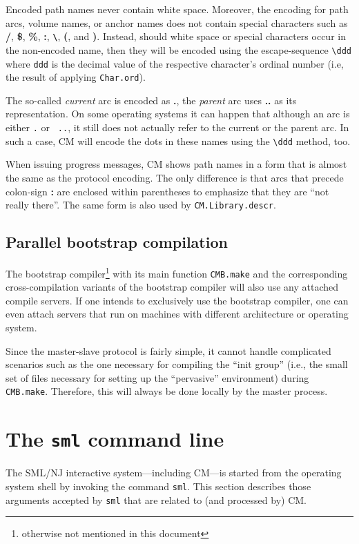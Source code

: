 \documentclass[titlepage,letterpaper]{article}
\begin{document}
Encoded path names never contain white space.  Moreover, the encoding
for path arcs, volume names, or anchor names does not contain special
characters such as {\bf /}, {\bf \$}, {\bf \%}, {\bf :}, {\bf
\verb|\|}, {\bf (}, and {\bf )}.  Instead, should white space or
special characters occur in the non-encoded name, then they will be
encoded using the escape-sequence \verb|\ddd| where {\tt ddd} is the
decimal value of the respective character's ordinal number (i.e, the
result of applying {\tt Char.ord}).

The so-called {\em current} arc is encoded as {\bf .}, the {\em
parent} arc uses {\bf ..} as its representation.  On some operating
systems it can happen that although an arc is either {\tt .} or {\tt
..}, it still does not actually refer to the current or the parent
arc.  In such a case, CM will encode the dots in these names using the
\verb|\ddd| method, too.

When issuing progress messages, CM shows path names in a form that is
almost the same as the protocol encoding.  The only difference is that
arcs that precede colon-sign {\bf :} are enclosed within parentheses
to emphasize that they are ``not really there''.  The same form is
also used by {\tt CM.Library.descr}.

\subsection{Parallel bootstrap compilation}

The bootstrap compiler\footnote{otherwise not mentioned in this
document} with its main function {\tt CMB.make} and the corresponding
cross-compilation variants of the bootstrap compiler will also use any
attached compile servers.  If one intends to exclusively use the
bootstrap compiler, one can even attach servers that run on machines
with different architecture or operating system.

Since the master-slave protocol is fairly simple, it cannot handle
complicated scenarios such as the one necessary for compiling the
``init group'' (i.e., the small set of files necessary for setting up
the ``pervasive'' environment) during {\tt CMB.make}.  Therefore, this
will always be done locally by the master process.

\section{The {\tt sml} command line}

The SML/NJ interactive system---including CM---is started from the
operating system shell by invoking the command {\tt sml}.
This section describes those arguments accepted by {\tt sml} that
are related to (and processed by) CM.
\end{document}
